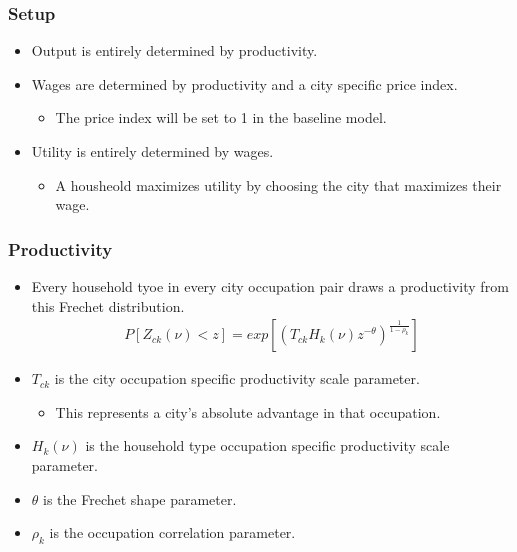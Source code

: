 \documentclass[serif, 9pt, aspectratio=32]{beamer}
\begin{document}
\begin{frame}
    \centering
    \frametitle{Setup}
    \begin{itemize}
        \setlength{\itemsep}{3em}
        \item Output is entirely determined by productivity.
        \item Wages are determined by productivity and a city specific price index.
              \begin{itemize}
                  \item The price index will be set to 1 in the baseline model.
              \end{itemize}
        \item Utility is entirely determined by wages.
              \begin{itemize}
                  \item A housheold maximizes utility by choosing the city that maximizes their wage.
              \end{itemize}
    \end{itemize}
\end{frame}

\begin{frame}
    \centering
    \frametitle{Productivity}
    \begin{itemize}
        \setlength{\itemsep}{2em}
        \item Every household tyoe in every city occupation pair draws a productivity from this Frechet distribution.
              \vspace{2em}
              \begin{equation}
                  \label{specific_Frechet}
                  \begin{aligned}
                      P[Z_{ck}(\nu) < z] = exp[(T_{ck} H_k(\nu) z^{-\theta})^{\frac{1}{1 - \rho_k}}]
                  \end{aligned}
              \end{equation}
    \end{itemize}
    \vspace{3em}
    \begin{itemize}
        \item $T_{ck}$ is the city occupation specific productivity scale parameter.
              \begin{itemize}
                  \item This represents a city's absolute advantage in that occupation.
              \end{itemize}
        \item $H_k(\nu)$ is the household type occupation specific productivity scale parameter.
        \item $\theta$ is the Frechet shape parameter.
        \item $\rho_k$ is the occupation correlation parameter.
    \end{itemize}
\end{frame}
\end{document}
